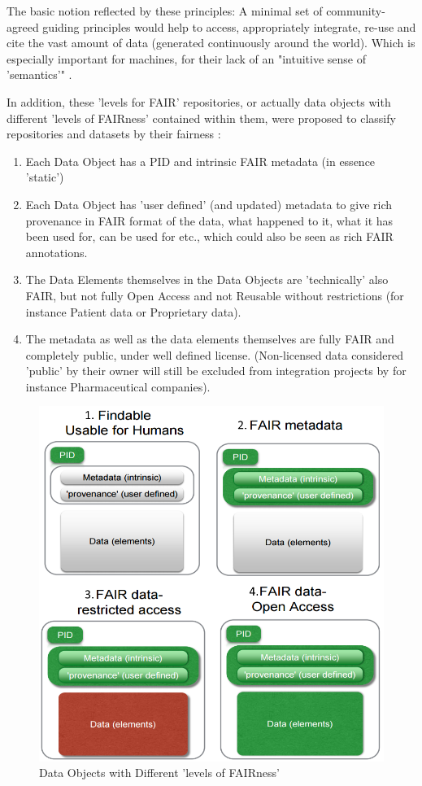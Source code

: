 \documentclass[a4paper,english,twoside,BCOR1.5cm,headsepline,DIV12,appendixprefix,final,12pt]{scrbook}
\begin{document}
The basic notion reflected by these principles: A minimal set of community-agreed guiding principles would help to access, appropriately integrate, re-use and cite the vast amount of data (generated continuously around the world). Which is especially important for machines, for their lack of an "intuitive sense of 'semantics'" \cite{fair2016}.

In addition, these 'levels for FAIR' repositories, or actually data objects with different 'levels of FAIRness' contained within them, were proposed to classify repositories and datasets by their fairness \cite{force11}:

\begin{enumerate}
\item Each Data Object has a PID and intrinsic FAIR metadata (in essence 'static')
\item Each Data Object has 'user defined' (and updated) metadata to give rich provenance in FAIR format of the data, what happened to it, what it has been used for, can be used for etc., which could also be seen as rich FAIR annotations.
\item The Data Elements themselves in the Data Objects are 'technically' also FAIR, but not fully Open Access and not Reusable without restrictions (for instance Patient data or Proprietary data).
\item The metadata as well as the data elements themselves are fully FAIR and completely public, under well defined license. (Non-licensed data considered 'public' by their owner will still be excluded from integration projects by for instance Pharmaceutical companies).
\end{enumerate}

\begin{figure}[!htbp]
\centering
  \includegraphics[width=12cm]{images/LevelsOfFairData.png}
  \caption{Data Objects with Different 'levels of FAIRness'}
  \label{fig:evalfairlevels}
\end{figure}
\end{document}
